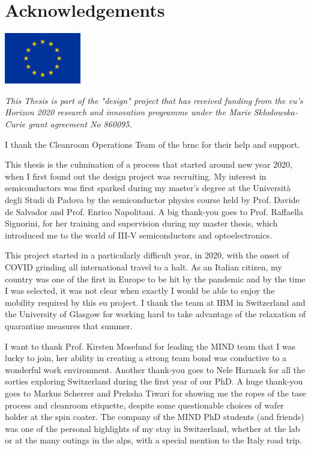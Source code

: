 \chapter{Acknowledgements}

\begin{center}
    \includegraphics[width=0.25\textwidth]{0_Abstract/EU_Flag.pdf}
\end{center}

\noindent \textit{This Thesis is part of the "\acl{design}" project that has received funding from the \acl{eu}'s Horizon 2020 research and innovation programme under the Marie Skłodowska-Curie grant agreement No 860095.}

I thank the Cleanroom Operations Team of the \acl{brnc} for their help and support.
\vspace{\baselineskip}


\noindent This thesis is the culmination of a process that started around new year 2020, when I first found out the \acs{design} project was recruiting. My interest in semiconductors was first sparked during my master's degree at the Università degli Studi di Padova by the semiconductor physics course held by Prof. Davide de Salvador and Prof. Enrico Napolitani. A big thank-you goes to Prof. Raffaella Signorini, for her training and supervision during my master thesis, which introduced me to the world of III-V semiconductors and optoelectronics.

This project started in a particularly difficult year, in 2020, with the onset of COVID grinding all international travel to a halt. As an Italian citizen, my country was one of the first in Europe to be hit by the pandemic and by the time I was selected, it was not clear when exactly I would be able to enjoy the mobility required by this \acs{eu} project. I thank the team at IBM in Switzerland and the University of Glasgow for working hard to take advantage of the relaxation of quarantine measures that summer. 

I want to thank Prof. Kirsten Moselund for leading the MIND team that I was lucky to join, her ability in creating a strong team bond was conductive to a wonderful work environment. Another thank-you goes to Nele Harnack for all the sorties exploring Switzerland during the first year of our PhD. A huge thank-you goes to Markus Scherrer and Preksha Tiwari for showing me the ropes of the \acs{tase} process and cleanroom etiquette, despite some questionable choices of wafer holder at the spin coater. The company of the MIND PhD students (and friends) was one of the personal highlights of my stay in Switzerland, whether at the lab or at the many outings in the alps, with a special mention to the Italy road trip.


